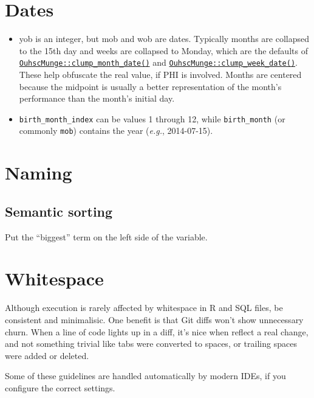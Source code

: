 \documentclass[
]{book}
\begin{document}
\hypertarget{style-dates}{%
\section{Dates}\label{style-dates}}

\begin{itemize}
\item
  yob is an integer, but mob and wob are dates. Typically months are collapsed to the 15th day and weeks are collapsed to Monday, which are the defaults of \href{http://ouhscbbmc.github.io/OuhscMunge/reference/clump_date.html}{\texttt{OuhscMunge::clump\_month\_date()}} and \href{http://ouhscbbmc.github.io/OuhscMunge/reference/clump_date.html}{\texttt{OuhscMunge::clump\_week\_date()}}. These help obfuscate the real value, if PHI is involved. Months are centered because the midpoint is usually a better representation of the month's performance than the month's initial day.
\item
  \texttt{birth\_month\_index} can be values 1 through 12, while \texttt{birth\_month} (or commonly \texttt{mob}) contains the year (\emph{e.g.}, 2014-07-15).
\end{itemize}

\hypertarget{naming}{%
\section{Naming}\label{naming}}

\hypertarget{style-naming-semantic}{%
\subsection{Semantic sorting}\label{style-naming-semantic}}

Put the ``biggest'' term on the left side of the variable.

\hypertarget{style-whitespace}{%
\section{Whitespace}\label{style-whitespace}}

Although execution is rarely affected by whitespace in R and SQL files, be consistent and minimalisic. One benefit is that Git diffs won't show unnecessary churn. When a line of code lights up in a diff, it's nice when reflect a real change, and not something trivial like tabs were converted to spaces, or trailing spaces were added or deleted.

Some of these guidelines are handled automatically by modern IDEs, if you configure the correct settings.
\end{document}
